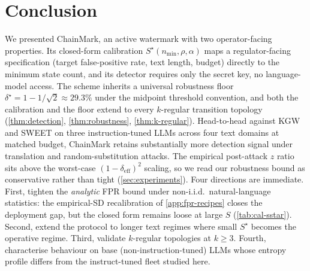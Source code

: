 \section{Conclusion}

We presented ChainMark, an active watermark with two
operator-facing properties. Its closed-form calibration
$S^\star(n_{\min}, \rho, \alpha)$ maps a regulator-facing
specification (target false-positive rate, text length, budget)
directly to the minimum state count, and its detector requires only
the secret key, no language-model access. The scheme inherits a universal robustness floor
$\delta^\star = 1 - 1/\sqrt{2} \approx 29.3\%$ under the midpoint
threshold convention, and both the calibration and the floor extend
to every $k$-regular transition topology
(\autoref{thm:detection}, \autoref{thm:robustness},
\autoref{thm:k-regular}). Head-to-head against KGW and SWEET on three instruction-tuned LLMs
across four text domains at matched budget, ChainMark retains substantially
more detection signal under translation and random-substitution
attacks. The empirical post-attack $z$ ratio sits above the
worst-case $(1-\delta_{\mathrm{eff}})^2$ scaling, so we read our
robustness bound as conservative rather than tight
(\autoref{sec:experiments}).
Four directions are immediate. First, tighten the \emph{analytic}
FPR bound under non-i.i.d.\ natural-language statistics: the
empirical-SD recalibration of \autoref{app:fpr-recipes} closes the
deployment gap, but the closed form remains loose at large $S$
(\autoref{tab:cal-sstar}). Second, extend the protocol to longer
text regimes where small $S^\star$ becomes the operative regime.
Third, validate $k$-regular topologies at $k\geq 3$. Fourth,
characterise behaviour on base (non-instruction-tuned) LLMs whose
entropy profile differs from the instruct-tuned fleet studied here.
